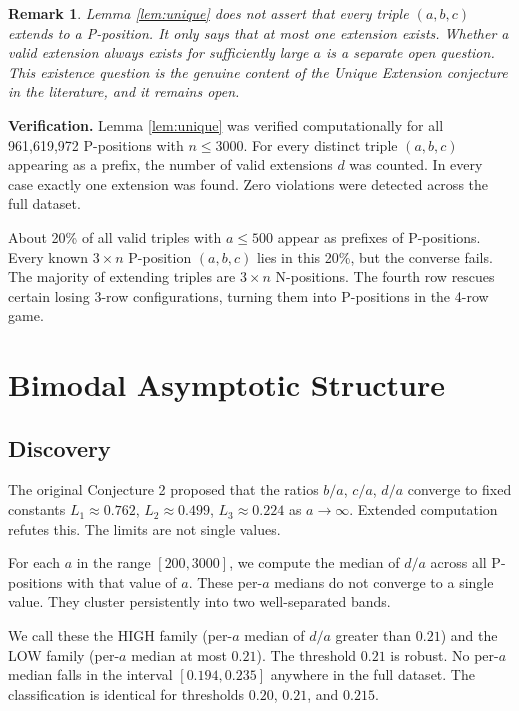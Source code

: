 \documentclass[12pt]{article}
\newtheorem{remark}{Remark}
\begin{document}
\begin{remark}
Lemma \ref{lem:unique} does not assert that every triple $(a,b,c)$
extends to a P-position. It only says that at most one extension
exists. Whether a valid extension always exists for sufficiently
large $a$ is a separate open question. This existence question is
the genuine content of the Unique Extension conjecture in the
literature, and it remains open.
\end{remark}

\noindent\textbf{Verification.}
Lemma \ref{lem:unique} was verified computationally for all 961,619,972
P-positions with $n \leq 3000$. For every distinct triple $(a,b,c)$
appearing as a prefix, the number of valid extensions $d$ was counted.
In every case exactly one extension was found. Zero violations were
detected across the full dataset.

About 20\% of all valid triples with $a \leq 500$ appear as prefixes
of P-positions. Every known $3 \times n$ P-position $(a,b,c)$ lies in
this 20\%, but the converse fails. The majority of extending triples
are $3 \times n$ N-positions. The fourth row rescues certain losing
3-row configurations, turning them into P-positions in the 4-row game.

\section{Bimodal Asymptotic Structure}
\label{sec:bimodal}

\subsection{Discovery}

The original Conjecture 2 proposed that the ratios $b/a$, $c/a$,
$d/a$ converge to fixed constants $L_1 \approx 0.762$,
$L_2 \approx 0.499$, $L_3 \approx 0.224$ as $a \to \infty$.
Extended computation refutes this. The limits are not single values.

For each $a$ in the range $[200, 3000]$, we compute the median of
$d/a$ across all P-positions with that value of $a$. These per-$a$
medians do not converge to a single value. They cluster persistently
into two well-separated bands.

We call these the HIGH family (per-$a$ median of $d/a$ greater than
$0.21$) and the LOW family (per-$a$ median at most $0.21$). The
threshold $0.21$ is robust. No per-$a$ median falls in the interval
$[0.194, 0.235]$ anywhere in the full dataset. The classification
is identical for thresholds $0.20$, $0.21$, and $0.215$.
\end{document}
